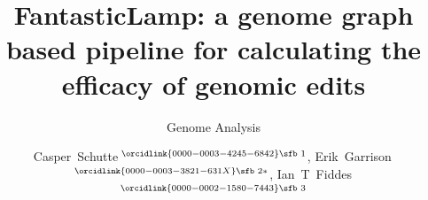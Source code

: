 \documentclass{bioinfo}
\theoremstyle{definition}
\begin{document}

\subtitle{Genome Analysis}

\title[FantasticLamp]{FantasticLamp: a genome graph based pipeline for calculating the efficacy of genomic edits}
\author[Schutte \textit{et~al}.]{

Casper~Schutte\,$^{\orcidlink{0000-0003-4245-6842}\text{\sfb 1}}$,
Erik~Garrison\,$^{\orcidlink{0000-0003-3821-631X}\text{\sfb 2}*}$,
Ian~T~Fiddes\,$^{\orcidlink{0000-0002-1580-7443}\text{\sfb 3}}$

}

\address{
$^{\text{\sf 1}}$Department of Bioinformatics and Computational Biology, University of Stellenbosch, Stellenbosch, 7600, Western Cape, South Africa \\
$^{\text{\sf 2}}$Department of Genetics, Genomics and Informatics, University of Tennessee Health Science Center, Memphis, 38163, Tennessee, USA \\
%
}



\end{document}
